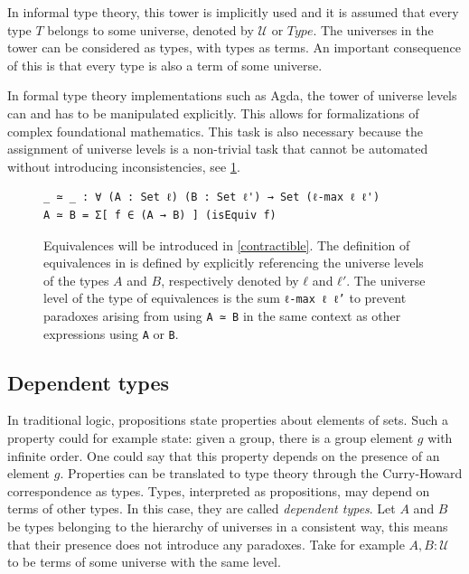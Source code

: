 \documentclass[11pt,a4paper,twoside,xetex,draft]{book}
\newcommand{\keyword}[1]{\emph{#1}\index{#1}}
\begin{document}
In informal type theory, this tower is implicitly used and it is assumed that every type $T$ belongs to some universe, denoted by $\mathcal{U}$ or $Type$. The universes in the tower can be considered as types, with types as terms. An important consequence of this is that every type is also a term of some universe.

In formal type theory implementations such as Agda, the tower of universe levels can and has to be manipulated explicitly. This allows for formalizations of complex foundational mathematics. This task is also necessary because the assignment of universe levels is a non-trivial task that cannot be automated without introducing inconsistencies, see \cref{AgdaEquivalences}.

\begin{figure}\label{AgdaEquivalences}
\centering
\begin{BVerbatim}
_ ≃ _ : ∀ (A : Set ℓ) (B : Set ℓ') → Set (ℓ-max ℓ ℓ')
A ≃ B = Σ[ f ∈ (A → B) ] (isEquiv f)
\end{BVerbatim}

\caption{Equivalences will be introduced in \cref{contractible}. The definition of equivalences in \cite{Moertberg2018} is defined by explicitly referencing the universe levels of the types $A$ and $B$, respectively denoted by $ℓ$ and $ℓ'$. The universe level of the type of equivalences is the sum  \texttt{ℓ-max ℓ ℓ'} to prevent paradoxes arising from using \texttt{A ≃ B} in the same context as other expressions using \texttt{A} or \texttt{B}.}
\end{figure}

\subsection{Dependent types}\label{dependencies}

In traditional logic, propositions state properties about elements of sets. Such a property could for example state: given a group, there is a group element $g$ with infinite order. One could say that this property depends on the presence of an element $g$. Properties can be translated to type theory through the Curry-Howard correspondence as types. Types, interpreted as propositions, may depend on terms of other types. In this case, they are called \keyword{dependent types}. Let $A$ and $B$ be types belonging to the hierarchy of universes in a consistent way, this means that their presence does not introduce any paradoxes. Take for example $A, B : \mathcal{U}$ to be terms of some universe with the same level.
\end{document}
